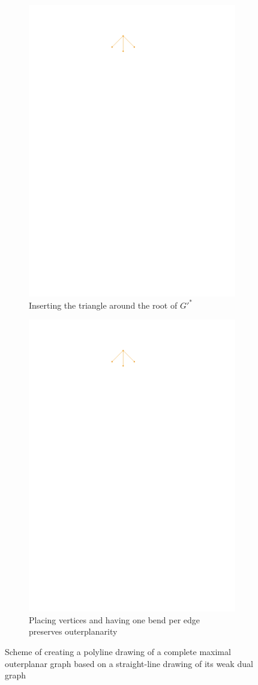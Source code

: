 \begin{figure}[H]
	\centering
	\begin{subfigure}{0.49\textwidth}
		\centering
		\includegraphics[page=2,width=0.49\linewidth]{graphics/outerplanar_weak_dual_illustration.pdf}
		\caption{Inserting the triangle around the root of $G'^*$}
	\end{subfigure}
	\begin{subfigure}{0.49\textwidth}
		\centering
		\includegraphics[page=3,width=0.49\linewidth]{graphics/outerplanar_weak_dual_illustration.pdf}
		\caption{Placing vertices and having one bend per edge preserves outerplanarity}
	\end{subfigure}
	\caption{Scheme of creating a polyline drawing of a complete maximal outerplanar graph based on a straight-line drawing of its weak dual graph}
\end{figure}
